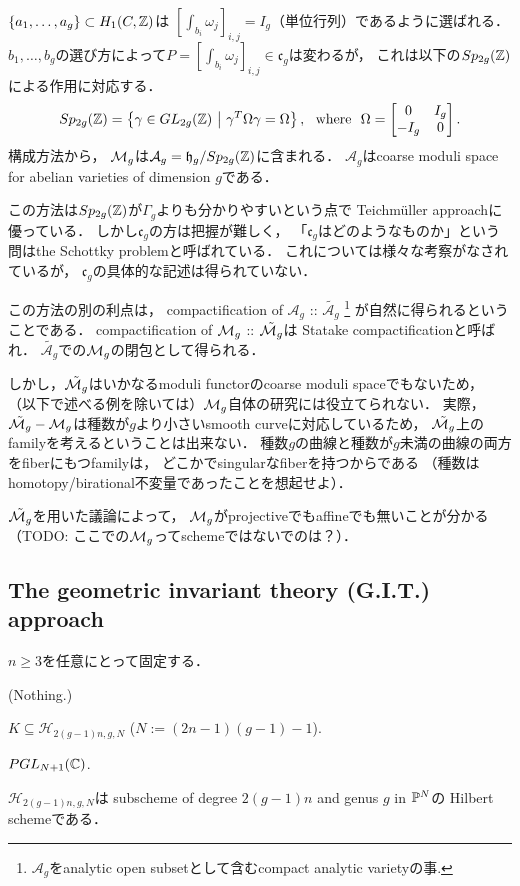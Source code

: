 \documentclass[a4paper]{jsarticle}
\newcommand{\modA}{\mathcal{A}}
\newcommand{\modH}{\mathcal{H}}
\begin{document}
    $\{a_1,\dots,a_g\} \subset H_1(C, \mathbb{Z})$は
    $[\int_{b_i} \omega_j ]_{i,j}=I_g$（単位行列）であるように選ばれる．
    $b_1,\dots,b_g$の選び方によって$P=[\int_{b_i} \omega_j ]_{i,j} \in \mathfrak{c}_g$は変わるが，
    これは以下の$Sp_{2g}(\mathbb{Z})$による作用に対応する．
    \[
        Sp_{2g}(\mathbb{Z})=
        \left\{
            \gamma \in GL_{2g}(\mathbb{Z})
            ~\middle|~
            \gamma^T \Omega \gamma=\Omega
        \right\},
        ~~\text{where}~~
        \Omega=\begin{bmatrix} 0 & I_g \\ -I_g & 0 \end{bmatrix}.
    \]
    構成方法から，
    $\mathcal{M}_g$は$\modA_g=\mathfrak{h}_g/Sp_{2g}(\Z)$に含まれる．
    $\modA_g$はcoarse moduli space for abelian varieties of dimension $g$である．

    この方法は$Sp_{2g}(\mathbb{Z})$が$\Gamma_g$よりも分かりやすいという点で
    Teichm\"uller approachに優っている．
    しかし$\mathfrak{c}_g$の方は把握が難しく，
    「$\mathfrak{c}_g$はどのようなものか」という問はthe Schottky problemと呼ばれている．
    これについては様々な考察がなされているが，
    $\mathfrak{c}_g$の具体的な記述は得られていない．

    この方法の別の利点は，
    compactification of $\modA_g$ :: $\tilde{\modA_g}$
    \footnote{ $\modA_g$をanalytic open subsetとして含むcompact analytic varietyの事. }
    が自然に得られるということである．
    compactification of $\mathcal{M}_g$ :: $\tilde{\mathcal{M}_g}$は
    Statake compactificationと呼ばれ．
    $\tilde{\modA_g}$での$\mathcal{M}_g$の閉包として得られる．
    
    しかし，$\tilde{\mathcal{M}_g}$はいかなるmoduli functorのcoarse moduli spaceでもないため，
    （以下で述べる例を除いては）$\mathcal{M}_g$自体の研究には役立てられない．
    実際，$\tilde{\mathcal{M}_g}-\mathcal{M}_g$は種数が$g$より小さいsmooth curveに対応しているため，
    $\tilde{\mathcal{M}_g}$上のfamilyを考えるということは出来ない．
    種数$g$の曲線と種数が$g$未満の曲線の両方をfiberにもつfamilyは，
    どこかでsingularなfiberを持つからである
    （種数はhomotopy/birational不変量であったことを想起せよ）．

    $\tilde{\mathcal{M}_g}$を用いた議論によって，
    $\mathcal{M}_g$がprojectiveでもaffineでも無いことが分かる
    （TODO: ここでの$\mathcal{M}_g$ってschemeではないでのは？）．

    \subsection{The geometric invariant theory (G.I.T.) approach}
    $n \geq 3$を任意にとって固定する．
    \begin{description}[leftmargin=!,labelwidth=\widthof{\bfseries Parameter Space}]
        \item[Extra Data] (Nothing.)
        \item[Parameter Space] $K \subseteq \modH_{2(g-1)n, g, N}$ ($N:=(2n-1)(g-1)-1$).
        \item[Group] $PGL_{N+1}(\mathbb{C})$.
    \end{description}
    $\modH_{2(g-1)n, g, N}$は
    subscheme of degree $2(g-1)n$ and genus $g$ in $\mathbb{P}^N$の
    Hilbert schemeである．
\end{document}
